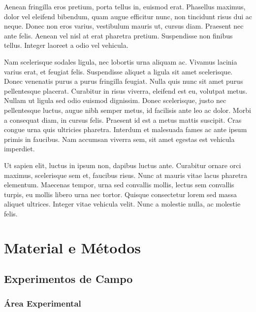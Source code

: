 \documentclass[book,A4paper,10pt,twoside,oldfontcommands]{memoir}\usepackage[]{graphicx}\usepackage[usenames,dvipsnames]{color}
\begin{document}
\begin{btUnit}
Aenean fringilla eros pretium, porta tellus in, euismod erat.
Phasellus maximus, dolor vel eleifend bibendum, quam augue efficitur
nunc, non tincidunt risus dui ac neque. Donec non eros varius,
vestibulum mauris ut, cursus diam. Praesent nec ante felis. Aenean vel
nisl at erat pharetra pretium. Suspendisse non finibus tellus. Integer
laoreet a odio vel vehicula.

Nam scelerisque sodales ligula, nec lobortis urna aliquam ac. Vivamus
lacinia varius erat, et feugiat felis. Suspendisse aliquet a ligula
sit amet scelerisque. Donec venenatis purus a purus fringilla feugiat.
Nulla quis nunc sit amet purus pellentesque placerat. Curabitur in
risus viverra, eleifend est eu, volutpat metus. Nullam ut ligula sed
odio euismod dignissim. Donec scelerisque, justo nec pellentesque
luctus, augue nibh semper metus, id facilisis ante leo ac dolor. Morbi
a consequat diam, in cursus felis. Praesent id est a metus mattis
suscipit. Cras congue urna quis ultricies pharetra. Interdum et
malesuada fames ac ante ipsum primis in faucibus. Nam accumsan viverra
sem, sit amet egestas est vehicula imperdiet.

Ut sapien elit, luctus in ipsum non, dapibus luctus ante. Curabitur
ornare orci maximus, scelerisque sem et, faucibus risus. Nunc at
mauris vitae lacus pharetra elementum. Maecenas tempor, urna sed
convallis mollis, lectus sem convallis turpis, eu mollis libero urna
nec tortor. Quisque consectetur lorem sed massa aliquet ultrices.
Integer vitae vehicula velit. Nunc a molestie nulla, ac molestie
felis.

\section{Material e Métodos}

\subsection{Experimentos de Campo}

\subsubsection{Área Experimental}


\end{btUnit}
\end{document}
